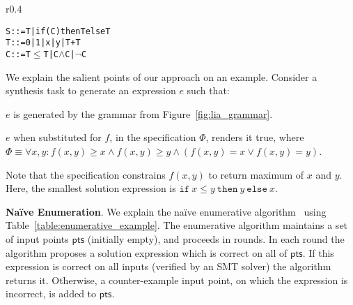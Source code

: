 \documentclass{llncs}
\newcommand\Points{\mathsf{pts}}
\newcommand\Expr{e}
\newcommand\Spec{\Phi}
\newcommand\SynthFun{f}
\newcommand\ITE[3]{\mathtt{if}~#1~\mathtt{then}~#2~\mathtt{else}~#3}
\renewcommand{\paragraph}[1]{\par\noindent\textbf{#1}.}
\begin{document}
\begin{wrapfigure}{r}{0.4\textwidth}
  \vspace*{-3ex}
  \begin{alltt}
  \fontsize{8}{10}\selectfont
S ::= T | if (C) then T else T
T ::= 0 | 1 | x | y | T + T
C ::= T \(\leq\) T | C \(\wedge\) C | \(\neg\) C
\end{alltt}
  \vspace*{-2ex}
  \caption{Grammar for linear integer expressions}
  \label{fig:lia_grammar}
  \vspace*{-1ex}
\end{wrapfigure}
We explain the salient points of our approach on an example.
Consider a synthesis task to generate an expression $\Expr$ such that:
\begin{inparaenum}[(a)]
\item $\Expr$ is generated by the grammar from Figure~\ref{fig:lia_grammar}.
\item $\Expr$ when substituted for $f$, in the specification
  $\Spec$, renders it true, where $\Spec \equiv \forall x, y :
  \SynthFun(x, y) \geq x \wedge \SynthFun(x, y) \geq y \wedge
  (\SynthFun(x,y) = x \vee \SynthFun(x,y) = y)$.
\end{inparaenum}
Note that the specification constrains $\SynthFun(x, y)$ to return
maximum of $x$ and $y$.
Here, the smallest solution expression is $\ITE{x \leq y}{y}{x}$.

\paragraph{Na\"ive Enumeration}
We explain the na\"ive enumerative
algorithm~\cite{udupa-transit} using
Table~\ref{table:enumerative_example}.
The enumerative algorithm maintains a set of input points
$\Points$ (initially empty), and proceeds in rounds.
In each round the algorithm proposes a solution expression which
is correct on all of $\Points$.
If this expression is correct on all inputs (verified by an SMT
solver) the algorithm returns it.
Otherwise, a counter-example input point, on which the expression is
incorrect, is added to $\Points$.
\end{document}
